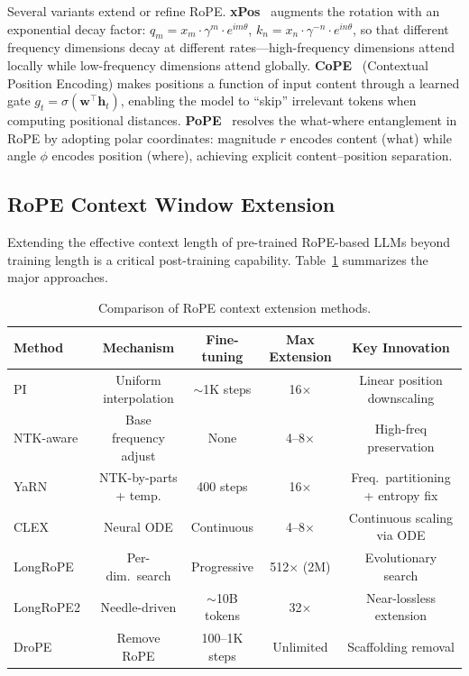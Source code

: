 Several variants extend or refine RoPE. \textbf{xPos}~\cite{sun2023length} augments the rotation with an exponential decay factor: $q_m = x_m \cdot \gamma^m \cdot e^{im\theta}$, $k_n = x_n \cdot \gamma^{-n} \cdot e^{in\theta}$, so that different frequency dimensions decay at different rates---high-frequency dimensions attend locally while low-frequency dimensions attend globally. \textbf{CoPE}~\cite{golovneva2024contextual} (Contextual Position Encoding) makes positions a function of input content through a learned gate $g_t = \sigma(\mathbf{w}^\top \mathbf{h}_t)$, enabling the model to ``skip'' irrelevant tokens when computing positional distances. \textbf{PoPE}~\cite{gopalakrishnan2025decoupling} resolves the what-where entanglement in RoPE by adopting polar coordinates: magnitude $r$ encodes content (what) while angle $\phi$ encodes position (where), achieving explicit content--position separation.

\subsection{RoPE Context Window Extension}
\label{subsec:rope_extension}

Extending the effective context length of pre-trained RoPE-based LLMs beyond training length is a critical post-training capability. Table~\ref{tab:rope_extension} summarizes the major approaches.

\begin{table}[t]
\centering
\caption{Comparison of RoPE context extension methods.}
\label{tab:rope_extension}
\small
\begin{tabular}{lcccc}
\hline
\textbf{Method} & \textbf{Mechanism} & \textbf{Fine-tuning} & \textbf{Max Extension} & \textbf{Key Innovation} \\
\hline
PI~\cite{chen2023extending} & Uniform interpolation & $\sim$1K steps & 16$\times$ & Linear position downscaling \\
NTK-aware & Base frequency adjust & None & 4--8$\times$ & High-freq preservation \\
YaRN~\cite{peng2023yarn} & NTK-by-parts + temp. & 400 steps & 16$\times$ & Freq.\ partitioning + entropy fix \\
CLEX~\cite{chen2024clex} & Neural ODE & Continuous & 4--8$\times$ & Continuous scaling via ODE \\
LongRoPE~\cite{ding2024longrope} & Per-dim.\ search & Progressive & 512$\times$ (2M) & Evolutionary search \\
LongRoPE2~\cite{longrope2_2025} & Needle-driven & $\sim$10B tokens & 32$\times$ & Near-lossless extension \\
DroPE~\cite{gelberg2026drope} & Remove RoPE & 100--1K steps & Unlimited & Scaffolding removal \\
\hline
\end{tabular}
\end{table}

